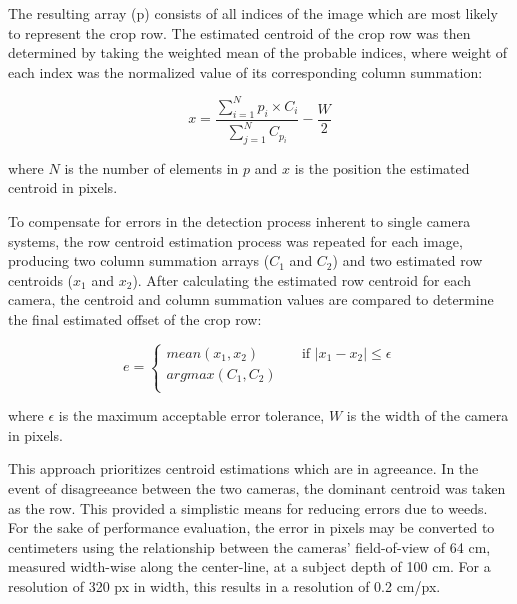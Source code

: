 \documentclass[authoryear]{elsarticle}
\begin{document}
The resulting array (p) consists of all indices of the image which are most
likely to represent the crop row. The estimated centroid of the crop
row was then determined by taking the weighted mean of the probable
indices, where weight of each index was the normalized value of its
corresponding column summation:

\begin{equation}
    x = \frac{\displaystyle\sum_{i=1}^{N} p_{i} \times
      C_{i}}{\displaystyle\sum_{j=1}^{N} C_{p_{i}}} - \frac{W}{2}
  \label{eq:centroid}
\end{equation}
\begin{flushleft}
where $N$ is the number of elements in $p$ and $x$ is the position the
estimated centroid in pixels.
\end{flushleft}

To compensate for errors in the detection process inherent to single
camera systems, the row centroid estimation process was repeated for
each image, producing two column summation arrays ($C_{1}$ and $C_{2}$) and two
estimated row centroids ($x_{1}$ and $x_{2}$). After calculating the estimated
row centroid for each camera, the centroid and column summation values
are compared to determine the final estimated offset of the crop row:

\begin{equation}
  e = 
  \begin{cases}
    mean(x_{1},x_{2})  & \quad \text{if } |x_{1}-x_{2}| \leq  \epsilon\\
    argmax(C_{1},C_{2})  & \quad  \\
  \end{cases}
  \label{eq:camera_selection}
\end{equation}
\begin{flushleft}
where $\epsilon$ is the maximum acceptable error tolerance, $W$ is the width of
the camera in pixels. 
\end{flushleft}

This approach prioritizes centroid estimations which are in
agreeance. In the event of disagreeance between the two cameras, the dominant
centroid was taken as the row. This provided a simplistic means for
reducing errors due to weeds. For the sake of performance evaluation,
the error in pixels may be converted to centimeters using the
relationship between the cameras’ field-of-view of 64 cm, measured
width-wise along the center-line, at a subject depth of 100 cm. For a
resolution of 320 px in width, this results in a resolution of 0.2 cm/px.
\end{document}
